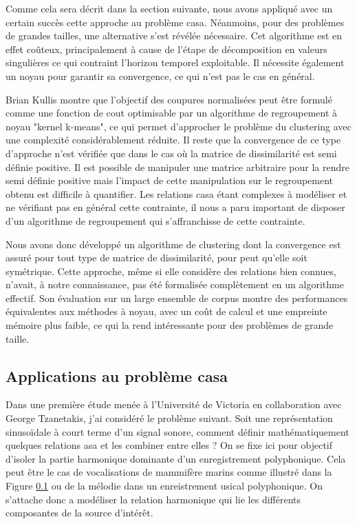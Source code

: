 Comme cela sera décrit dans la section suivante, nous avons appliqué avec un certain succès cette approche au problème casa. Néanmoins, pour des problèmes de grandes tailles, une alternative s'est révélée nécessaire. Cet algorithme est en effet coûteux, principalement à cause de l'étape de décomposition en valeurs singulières ce qui contraint l'horizon temporel exploitable. Il nécessite également un noyau pour garantir sa convergence, ce qui n'est pas le cas en général.

Brian Kullis montre que l'objectif des coupures normalisées peut être formulé comme une fonction de cout optimisable par un algorithme de regroupement à noyau "kernel k-means", ce qui permet d'approcher le problème du clustering avec une complexité considérablement réduite. Il reste que la convergence de ce type d'approche n'est vérifiée que dans le cas où la matrice de dissimilarité est semi définie positive. Il est possible de manipuler une matrice arbitraire pour la rendre semi définie positive \cite{optimal2003} mais l'impact de cette manipulation sur le regroupement obtenu est difficile à quantifier. Les relations casa étant complexes à modéliser et ne vérifiant pas en général cette contrainte, il nous a paru important de disposer d'un algorithme de regroupement qui s'affranchisse de cette contrainte.

Nous avons donc développé un algorithme de clustering dont la convergence est assuré pour tout type de matrice de dissimilarité, pour peut qu'elle soit symétrique. Cette approche, même si elle considère des relations bien connues, n'avait, à notre connaissance, pas été formalisée complètement en un algorithme effectif. Son évaluation sur un large ensemble de corpus \cite{keogh} montre des performances équivalentes aux méthodes à noyau, avec un coût de calcul et une empreinte mémoire plus faible, ce qui la rend intéressante pour des problèmes de grande taille\cite{rossignolKaverages}.

\subsection{Applications au problème casa}

Dans une première étude menée à l'Université de Victoria en collaboration avec George Tzanetakis, j'ai considéré le problème suivant. Soit une représentation sinusoïdale à court terme d'un signal sonore, comment définir mathématiquement quelques relations asa et les combiner entre elles ? On se fixe ici pour objectif d'isoler la partie harmonique dominante d'un enregistrement polyphonique. Cela peut être le cas de vocalisations de mammifère marins comme illustré dans la Figure \ref{} ou de la mélodie dans un enreistrement usical polyphonique. On s'attache donc a modéliser la relation harmonique qui lie les différents composantes de la source d'intérêt.


